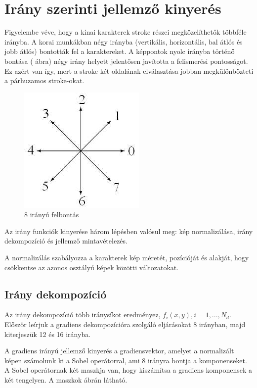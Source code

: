 \section{Irány szerinti jellemző kinyerés}
Figyelembe véve, hogy a kínai karakterek stroke részei megközelíthetők többféle irányba. A korai munkákban négy irányba (vertikális, horizontális, bal átlós és jobb átlós) bontották fel a karaktereket. A képpontok nyolc irányba történő bontása ( ábra) négy irány helyett jelentősen javította a felismerési pontosságot. Ez azért van így, mert a stroke két oldalának elválasztása jobban megkülönbözteti a párhuzamos stroke-okat.

\begin{figure}[h]
\centering
\includegraphics[scale=0.5]{images/direction8}
\caption{8 irányú felbontás}
\label{fig:direction8}
\end{figure}

Az irány funkciók kinyerése\cite{liu2008handwritten} három lépésben valósul meg: kép normalizálása, irány dekompozíció és jellemző mintavételezés. 

A normalizálás szabályozza a karakterek kép méretét, pozícióját és alakját, hogy csökkentse az azonos osztályú képek közötti változatokat.

\subsection{Irány dekompozíció}

Az irány dekompozíció\cite{liu2008handwritten} több iránysíkot eredményez, $f_i(x, y), i = 1,. . . , N_d$. Először leírjuk a gradiens dekompozícióra szolgáló eljárásokat 8 irányban, majd kiterjeszük 12 és 16 irányba.

A gradiens irányú jellemző kinyerés a gradiensvektor, amelyet a normalizált képen számolunk ki a Sobel operátorral, ami 8 irányra bontja a komponenseket. A Sobel operátornak két maszkja van, hogy kiszámítsa a gradiens komponensek a két tengelyen. A maszkok  ábrán látható.

